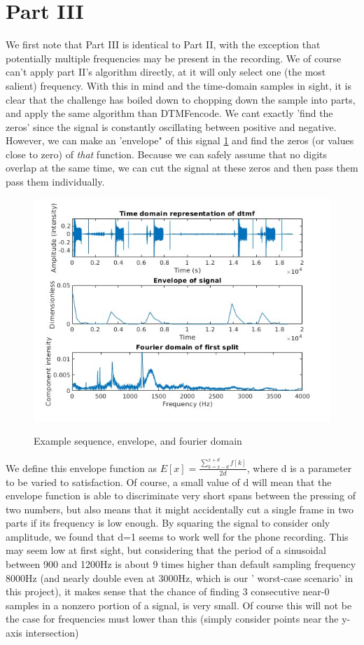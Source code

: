 \documentclass{article}
\begin{document}
\section{Part III}
We first note that Part III is identical to Part II, with the exception that potentially multiple frequencies may be present in the recording. We of course can't apply part II's algorithm directly, at it will only select one (the most salient) frequency.
With this in mind and the time-domain samples in sight, it is clear that the challenge has boiled down to chopping down the sample into parts, and apply the same algorithm than DTMFencode.
We cant exactly 'find the zeros' since the signal is constantly oscillating between positive and negative. However, we can make an 'envelope" of this signal \ref{envelopedemonstration} and find the zeros (or values close to zero) of \emph{that} function. Because we can safely assume that no digits overlap at the same time, we can cut the signal at these zeros and then pass them pass them individually.
\begin{figure}[h]
	\includegraphics[width =\textwidth]{sequence.jpg}
	\label{envelopedemonstration}
	\caption{Example sequence, envelope, and fourier domain}
\end{figure}

We define this envelope function as $E[x]=\frac{\sum_{k=x-d}^{x+d}f[k]}{2d}$, where d is a parameter to be varied to satisfaction.
Of course, a small value of d will mean that the envelope function is able to discriminate very short spans between the pressing of two numbers, but also means that it might accidentally cut a single frame in two parts if its frequency is low enough.
By squaring the signal to consider only amplitude, we found that d=1 seems to work well for the phone recording. This may seem low at first sight, but considering that the period of a sinusoidal between 900 and 1200Hz is about 9 times higher than default sampling frequency  8000Hz (and nearly double even at 3000Hz, which is our ' worst-case scenario' in this project), it makes sense that the chance of finding 3 consecutive near-0 samples in a nonzero portion of a signal, is very small. Of course this will not be the case for frequencies must lower than this (simply consider points near the y-axis intersection)
\end{document}
